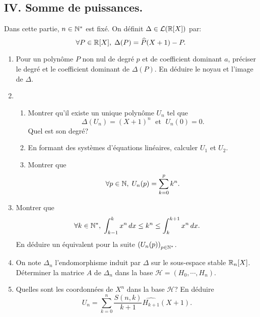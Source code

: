 \subsection*{IV. Somme de puissances.}
Dans cette partie, $n\in \mathbb{N}^*$ est fixé. On définit $\Delta \in \mathcal{L}(\mathbb{R}[X])$ par:
\[
 \forall P \in \mathbb{R}[X], \; \Delta(P) = \widehat{P}(X+1) - P.
\]
\begin{enumerate}
 \item Pour un polynôme $P$ non nul de degré $p$ et de coefficient dominant $a$, préciser le degré et le coefficient dominant de $\Delta(P)$. En déduire le noyau et l'image de $\Delta$.
 \item 
   \begin{enumerate}
    \item Montrer qu'il existe un unique polynôme $U_n$ tel que 
\[
 \Delta(U_n) = (X+1)^n\; \text{ et } \; U_n(0) = 0.
\]
    Quel est son degré?
    \item En formant des systèmes d'équations linéaires, calculer $U_1$ et $U_2$.
    \item Montrer que 
\[
 \forall p \in \mathbb{N}, \; U_n(p) = \sum_{k=0}^p k^n.
\]
   \end{enumerate}
   
 \item Montrer que 
\[
 \forall k \in \mathbb{N}^*, \; \int_{k-1}^{k} x^n\,dx \leq k^n \leq \int_{k}^{k+1} x^n\,dx.
\]
En déduire un équivalent pour la suite $\left( U_n(p) \right)_{p \in \mathbb{N}^*}$.
 
 \item On note $\Delta_n$ l'endomorphisme induit par $\Delta$ sur le sous-espace stable $\mathbb{R}_n[X]$.\newline
 Déterminer la matrice $A$ de $\Delta_n$ dans la base $\mathcal{H} = (H_0,\cdots, H_n)$.
 
 \item Quelles sont les coordonnées de $X^n$ dans la base $\mathcal{H}$? En déduire 
\[
 U_n = \sum_{k=0}^{n}\frac{S(n,k)}{k+1}\widehat{H_{k+1}}(X+1).
\]

\end{enumerate}
